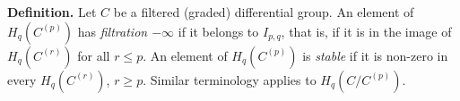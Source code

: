 \textbf{Definition.} Let $C$ be a filtered (graded) differential group. An element of $H_q(C^{(p)})$ has \textit{filtration $-\infty$} if it belongs to $I_{p,q}$, that is, if it is in the image of $H_q(C^{(r)})$ for all $r \leq p$. An element of $H_q(C^{(p)})$ is \textit{stable} if it is non-zero in every $H_q(C^{(r)})$, $r \geq p$. Similar terminology applies to $H_q(C/C^{(p)})$.
